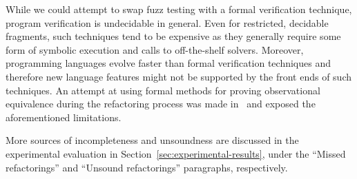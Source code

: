 \documentclass[10pt,conference]{IEEEtran}
\begin{document}
While we could attempt to swap fuzz testing with a formal verification technique,
program verification is undecidable in general.
Even for restricted, decidable fragments, such
techniques tend to be expensive as they generally require some form of
symbolic execution and calls to off-the-shelf solvers.  Moreover,
programming languages evolve faster than formal verification techniques and
therefore new language features might not be supported by the front ends of
such techniques. An attempt at using formal methods for proving
observational equivalence during the refactoring process was made in~\cite{DBLP:journals/corr/abs-1712-07388} and exposed the aforementioned limitations.

More sources of incompleteness and unsoundness are discussed in the experimental evaluation in Section~\ref{sec:experimental-results},
under the ``Missed refactorings'' and ``Unsound refactorings'' paragraphs, respectively.







\end{document}
